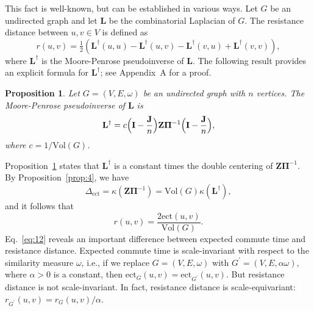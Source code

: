 \documentclass[10pt,twocolumn]{article}
\newtheorem{proposition}[theorem]{Proposition}
\numberwithin{equation}{section}
\begin{document}
This fact is well-known, but can be established in various ways.
Let $G$
be an undirected graph and let $\mathbf{L}$ be the combinatorial
Laplacian of $G$. The resistance distance between $u, v \in
V$ is defined as
\begin{equation*}
  r(u,v) = \tfrac{1}{2}(\mathbf{L}^{\dagger}(u,u) - 
\mathbf{L}^{\dagger}(u,v) -
  \mathbf{L}^{\dagger}(v,u) + \mathbf{L}^{\dagger}(v,v)),
\end{equation*}
where $\mathbf{L}^{\dagger}$ is the Moore-Penrose
pseudoinverse of $\mathbf{L}$. 
The following result provides an explicit formula for
$\mathbf{L}^{\dagger}$; see Appendix~A for a proof.
\begin{proposition}
  \label{prop:5}
  Let $G = (V,E,\omega)$ be an undirected graph with $n$ vertices. The
  Moore-Penrose pseudoinverse of $\mathbf{L}$ is
  \begin{equation}
    \label{eq:13}
    \mathbf{L}^{\dagger} = c \Bigl(\mathbf{I} - 
\frac{\mathbf{J}}{n}\Bigr) \mathbf{Z}
    \bm{\Pi}^{-1} \Bigl(\mathbf{I} - \frac{\mathbf{J}}{n}\Bigr),
  \end{equation}
  where $c = 1/\mathrm{Vol}(G)$. 
\end{proposition}
\noindent
Proposition~\ref{prop:5} states that
$\mathbf{L}^{\dagger}$ is a constant times the double centering of
$\mathbf{Z}\bm{\Pi}^{-1}$. By Proposition~\ref{prop:4}, we have 
\begin{equation}
  \label{eq:42}
 \Delta_{\mathrm{ect}} = \kappa(\mathbf{Z}\bm{\Pi}^{-1}) = \mathrm{Vol}(G)
\kappa(\mathbf{L}^{\dagger}),
\end{equation}
and it follows that
\begin{equation}
  \label{eq:12}
  r(u,v) = \frac{2 \mathrm{ect}(u,v)}{\mathrm{Vol}(G)}.
\end{equation}
\noindent
Eq.~\eqref{eq:12} reveals an important difference between
expected commute time and resistance distance. Expected commute time
is scale-invariant with respect to the similarity measure $\omega$,
i.e., if we replace $G = (V,E,\omega)$ with 
$G^\prime = (V,E, \alpha \omega)$, where
$\alpha > 0$ is a constant, then
$\mbox{ect}_{G}(u,v) = \mbox{ect}_{G^\prime}(u,v)$. 
But resistance distance is not scale-invariant.
In fact, resistance distance is scale-equivariant:
$r_{G^\prime}(u,v) = r_{G}(u,v)/\alpha$. 
\end{document}
